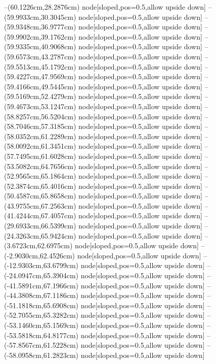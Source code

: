 --(60.1226cm,28.2876cm) node[sloped,pos=0.5,allow upside down]{\ArrowIn}
--(59.9933cm,30.3045cm) node[sloped,pos=0.5,allow upside down]{\ArrowIn}
--(59.9348cm,36.9777cm) node[sloped,pos=0.5,allow upside down]{\ArrowIn}
--(59.9902cm,39.1762cm) node[sloped,pos=0.5,allow upside down]{\ArrowIn}
--(59.9335cm,40.9068cm) node[sloped,pos=0.5,allow upside down]{\ArrowIn}
--(59.6573cm,43.2787cm) node[sloped,pos=0.5,allow upside down]{\ArrowIn}
--(59.5513cm,45.1792cm) node[sloped,pos=0.5,allow upside down]{\ArrowIn}
--(59.4227cm,47.9569cm) node[sloped,pos=0.5,allow upside down]{\ArrowIn}
--(59.4166cm,49.5445cm) node[sloped,pos=0.5,allow upside down]{\ArrowIn}
--(59.5169cm,52.4279cm) node[sloped,pos=0.5,allow upside down]{\ArrowIn}
--(59.4673cm,53.1247cm) node[sloped,pos=0.5,allow upside down]{\arrowIn}
--(58.8257cm,56.5204cm) node[sloped,pos=0.5,allow upside down]{\ArrowIn}
--(58.7046cm,57.3185cm) node[sloped,pos=0.5,allow upside down]{\arrowIn}
--(58.0352cm,61.2289cm) node[sloped,pos=0.5,allow upside down]{\ArrowIn}
--(58.0092cm,61.3451cm) node[sloped,pos=0.5,allow upside down]{\arrowIn}
--(57.7495cm,61.6028cm) node[sloped,pos=0.5,allow upside down]{\arrowIn}
--(53.5082cm,64.7656cm) node[sloped,pos=0.5,allow upside down]{\ArrowIn}
--(52.9565cm,65.1864cm) node[sloped,pos=0.5,allow upside down]{\arrowIn}
--(52.3874cm,65.4016cm) node[sloped,pos=0.5,allow upside down]{\arrowIn}
--(50.4587cm,65.8658cm) node[sloped,pos=0.5,allow upside down]{\ArrowIn}
--(43.9755cm,67.2563cm) node[sloped,pos=0.5,allow upside down]{\ArrowIn}
--(41.4244cm,67.4057cm) node[sloped,pos=0.5,allow upside down]{\ArrowIn}
--(29.6933cm,66.5399cm) node[sloped,pos=0.5,allow upside down]{\ArrowIn}
--(24.3263cm,65.9424cm) node[sloped,pos=0.5,allow upside down]{\ArrowIn}
--(3.6723cm,62.6975cm) node[sloped,pos=0.5,allow upside down]{\ArrowIn}
--(-2.9030cm,62.4526cm) node[sloped,pos=0.5,allow upside down]{\ArrowIn}
--(-12.9303cm,63.6799cm) node[sloped,pos=0.5,allow upside down]{\ArrowIn}
--(-24.0947cm,65.3904cm) node[sloped,pos=0.5,allow upside down]{\ArrowIn}
--(-41.5891cm,67.1966cm) node[sloped,pos=0.5,allow upside down]{\ArrowIn}
--(-44.3808cm,67.1186cm) node[sloped,pos=0.5,allow upside down]{\ArrowIn}
--(-51.1818cm,65.6908cm) node[sloped,pos=0.5,allow upside down]{\ArrowIn}
--(-52.7055cm,65.3282cm) node[sloped,pos=0.5,allow upside down]{\ArrowIn}
--(-53.1460cm,65.1569cm) node[sloped,pos=0.5,allow upside down]{\arrowIn}
--(-53.5818cm,64.8177cm) node[sloped,pos=0.5,allow upside down]{\arrowIn}
--(-57.8567cm,61.5228cm) node[sloped,pos=0.5,allow upside down]{\ArrowIn}
--(-58.0958cm,61.2823cm) node[sloped,pos=0.5,allow upside down]{\arrowIn}
